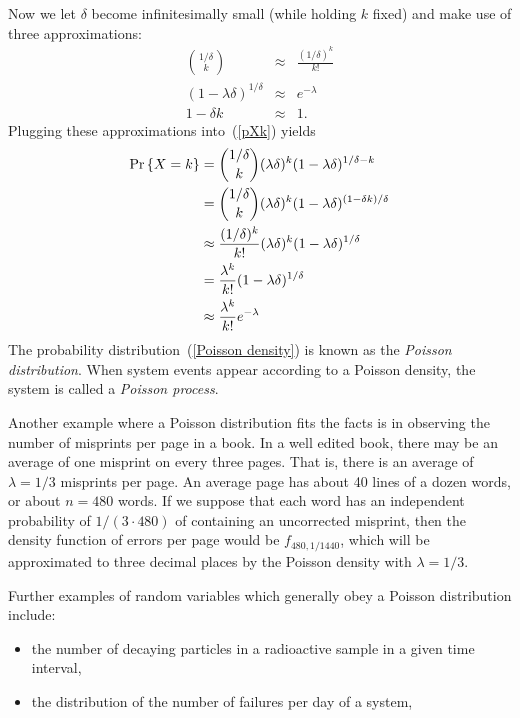 \documentclass[11pt,twoside]{article}
\begin{document}
\begin{optional}
Now we let $\delta$ become infinitesimally small (while holding $k$ fixed)
and make use of three approximations:
\begin{eqnarray*}
\binom{1/\delta}{k} &\approx & \frac{(1/\delta)^k}{k!}\\
(1 - \lambda\delta)^{1/\delta} &\approx & e^{-\lambda}\\
1 - \delta k & \approx & 1.
\end{eqnarray*}
Plugging these approximations into~(\ref{pXk}) yields
\begin{align}
\mathop{\textup{Pr}}\nolimits\left\{X=k\right\}
   &=\binom{1/\delta}{k}(\lambda\delta)^k(1 - \lambda\delta)^{1/\delta - k}\notag\\
   &=\binom{1/\delta}{k}(\lambda\delta)^k(1 - \lambda\delta)^{(1 - \delta k)/\delta}\notag\\
&\approx \frac{(1/\delta)^k}{k!} (\lambda\delta)^k(1 -\lambda\delta)^{1/\delta}\notag\\
&= \frac{\lambda^k}{k!} (1 -\lambda\delta)^{1/\delta}\notag\\
&\approx \frac{\lambda^k}{k!} e^{-\lambda}\label{Poisson density}
\end{align}
The probability distribution~(\ref{Poisson density}) is known as the
\emph{Poisson distribution}.  When system events appear according to a
Poisson density, the system is called a \emph{Poisson process}.

Another example where a Poisson distribution fits the facts is in
observing the number of misprints per page in a book.  In a well edited
book, there may be an average of one misprint on every three pages.  That
is, there is an average of $\lambda = 1/3$ misprints per page.  An average
page has about 40 lines of a dozen words, or about $n = 480$ words.  If we
suppose that each word has an independent probability of $1/(3 \cdot 480)$
of containing an uncorrected misprint, then the density function of errors
per page would be $f_{480,1/1440}$, which will be approximated to three
decimal places by the Poisson density with $\lambda = 1/3$.

Further examples of random variables which generally obey a Poisson
distribution include:
\begin{itemize}

\item the number of decaying particles in a radioactive sample in a
given time interval,

\item the distribution of the number of failures per day of a system,


\end{itemize}
\end{optional}
\end{document}
